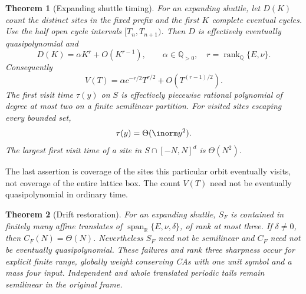 \documentclass[11pt,letterpaper]{article}
\numberwithin{equation}{section}
\newtheorem{theorem}{Theorem}[section]
\theoremstyle{definition}
\theoremstyle{remark}
\newcommand{\Q}{\mathbb Q}
\newcommand{\R}{\mathbb R}
\newcommand{\rank}{\operatorname{rank}}
\begin{document}
\begin{theorem}[Expanding shuttle timing]\label{smc:og:thm:timing}
For an expanding shuttle, let $D(K)$ count the distinct sites in the fixed prefix and the first $K$ complete eventual cycles. Use the half open cycle intervals $[T_n,T_{n+1})$. Then $D$ is effectively eventually quasipolynomial and
\begin{equation}\label{smc:og:eq:Dgeneral}
 D(K)=\alpha K^r+O(K^{r-1}),\qquad \alpha\in\Q_{>0},\quad r=\rank_\Q\{E,\nu\}.
\end{equation}
Consequently
\begin{equation}\label{smc:og:eq:Vgeneral}
 V(T)=\alpha c^{-r/2}T^{r/2}+O(T^{(r-1)/2}).
\end{equation}
The first visit time $\tau(y)$ on $S$ is effectively piecewise rational polynomial of degree at most two on a finite semilinear partition. For visited sites escaping every bounded set,
\begin{equation}\label{smc:og:eq:arrivalorder}
 \tau(y)=\Theta(\inorm y^2).
\end{equation}
The largest first visit time of a site in $S\cap[-N,N]^d$ is $\Theta(N^2)$.
\end{theorem}
The last assertion is coverage of the sites this particular orbit eventually visits, not coverage of the entire lattice box. The count $V(T)$ need not be eventually quasipolynomial in ordinary time.

\begin{theorem}[Drift restoration]\label{smc:og:thm:drift}
For an expanding shuttle, $S_F$ is contained in finitely many affine translates of $\operatorname{span}_{\R}\{E,\nu,\delta\}$, of rank at most three. If $\delta\ne0$, then $C_F(N)=\Theta(N)$. Nevertheless $S_F$ need not be semilinear and $C_F$ need not be eventually quasipolynomial. These failures and rank three sharpness occur for explicit finite range, globally weight conserving CAs with one unit symbol and a mass four input. Independent and whole translated periodic tails remain semilinear in the original frame.
\end{theorem}
\end{document}
